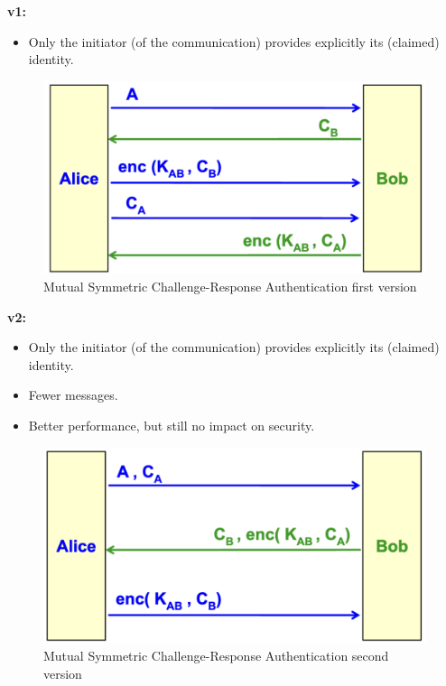 \begin{multicols}{2}

    \begin{center}
        {\large{\textbf{v1:}}}
    \end{center}
    \begin{itemize}
        \item Only the initiator (of the communication) provides explicitly its (claimed) identity.
    \end{itemize}
    \begin{figure}[H]
        \centering
        \includegraphics[width=\linewidth]{Images/Authentication/msCRA.png}
        \caption{Mutual Symmetric Challenge-Response Authentication first version}
    \end{figure}
    \columnbreak

    \begin{center}
        \large{\textbf{v2:}}
    \end{center}
    \begin{itemize}
        \item Only the initiator (of the communication) provides explicitly its (claimed) identity.
        \item Fewer messages.
        \item Better performance, but still no impact on security.
    \end{itemize}

    \begin{figure}[H]
        \centering
        \includegraphics[width=\linewidth]{Images/Authentication/msCRAv2.png}
        \caption{Mutual Symmetric Challenge-Response Authentication second version}
    \end{figure}
    
\end{multicols}

